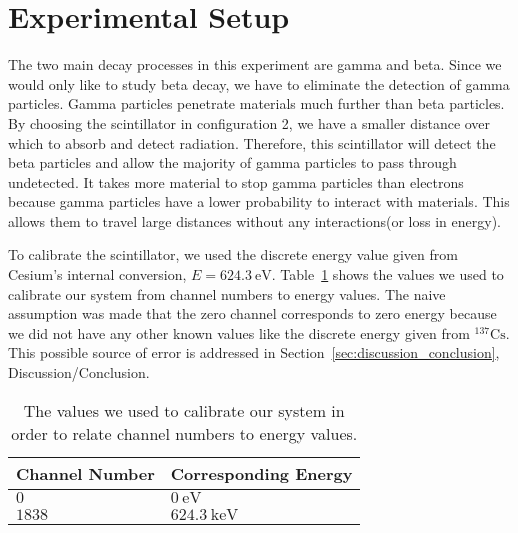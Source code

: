 
\section{Experimental Setup} 

\label{sec:experimental_setup} The two main decay processes in this experiment are gamma and beta. Since we would only like to study beta decay, we have to eliminate the detection of gamma particles. Gamma particles penetrate materials much further than beta particles. By choosing the scintillator in configuration 2, we have a smaller distance over which to absorb and detect radiation. Therefore, this scintillator will detect the beta particles and allow the majority of gamma particles to pass through undetected. It takes more material to stop gamma particles than electrons because gamma particles have a lower probability to interact with materials.  This allows them to travel large distances without any interactions(or loss in energy).

To calibrate the scintillator, we used the discrete energy value given from Cesium's internal conversion, $E=624.3~\text{eV}$. Table~\ref{tab:calibrationNumbers} shows the values we used to calibrate our system from channel numbers to energy values.  The naive assumption was made that the zero channel corresponds to zero energy because we did not have any other known values like the discrete energy given from $^{137}\text{Cs}$. This possible source of error is addressed in Section~\ref{sec:discussion_conclusion}, Discussion/Conclusion.
\begin{table}
	[tbp] 
	\begin{center}
		\begin{tabular}
{ll} \toprule Channel Number & Corresponding Energy\\
                \midrule $0$ &        $0~\text{eV}$\\
                      $1838$ &    $624.3~\text{keV}$\\
\bottomrule 
		\end{tabular}
	\end{center}
	\caption{The values we used to calibrate our system in order to relate channel numbers to energy values.} \label{tab:calibrationNumbers} 
\end{table}%


